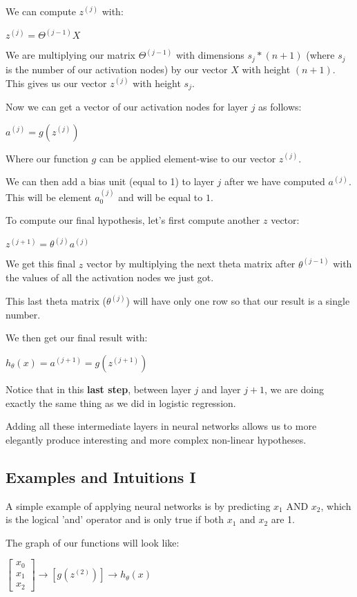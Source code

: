 \documentclass{article}
\begin{document}
We can compute $z^{(j)}$ with:

$z^{(j)}=\Theta^{(j−1)}X$

We are multiplying our matrix $\Theta^{(j−1)}$ with dimensions $s_j*(n+1)$ (where $s_j$ is the number of our activation nodes) by our vector $X$ with height $(n+1)$. This gives us our vector $z^{(j)}$ with height $s_j$.

Now we can get a vector of our activation nodes for layer $j$ as follows:

$a^{(j)}=g(z^{(j)})$

Where our function $g$ can be applied element-wise to our vector $z^{(j)}$.

We can then add a bias unit (equal to 1) to layer $j$ after we have computed $a^{(j)}$. This will be element $a_0^{(j)}$ and will be equal to $1$.

To compute our final hypothesis, let's first compute another $z$ vector:

$z^{(j+1)}=\theta^{(j)}a^{(j)}$

We get this final $z$ vector by multiplying the next theta matrix after $\theta^{(j−1)}$ with the values of all the activation nodes we just got.

This last theta matrix ($\theta^{(j)}$) will have only one row so that our result is a single number.

We then get our final result with:

$h_\theta(x)=a^{(j+1)}=g(z^{(j+1)})$

Notice that in this \textbf{last step}, between layer $j$ and layer $j+1$, we are doing exactly the same thing as we did in logistic regression.

Adding all these intermediate layers in neural networks allows us to more elegantly produce interesting and more complex non-linear hypotheses.
\subsection{Examples and Intuitions I}

A simple example of applying neural networks is by predicting $x_1$ AND $x_2$, which is the logical 'and' operator and is only true if both $x_1$ and $x_2$ are 1.

The graph of our functions will look like:

$\left[\begin{matrix}
x_0 \\
x_1 \\
x_2
\end{matrix}\right]
\to
\left[g(z^{(2)}) \right]
\to 
h_{\theta}(x)
$
\end{document}
